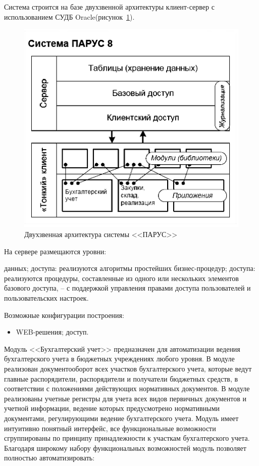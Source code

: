 \documentclass[14pt,a4paper]{reportmod}
\begin{document}
Система строится на базе двухзвенной архитектуры клиент-сервер с использованием СУДБ Oracle(рисунок~\ref{pic:parus_pic1}).
\begin{figure}
  \centering
  \includegraphics[scale=0.7]{pics/parus_img1_wb}
  \caption{Двухзвенная архитектура системы <<ПАРУС>>}
  \label{pic:parus_pic1}
\end{figure}
На сервере размещаются уровни:
\begin{itemize}
 данных;
 доступа: реализуются алгоритмы простейших бизнес-процедур;
 доступа: реализуются процедуры, составленные из одного или нескольких элементов базового доступа, – с поддержкой управления правами доступа пользователей и пользовательских настроек.
\end{itemize}
Возможные конфигурации построения:
\begin{itemize}
  ;
   сеть;
  \item WEB-решения;
   доступ.
\end{itemize}
Модуль <<Бухгалтерский учет>> предназначен для автоматизации ведения бухгалтерского учета в бюджетных учреждениях любого уровня. В модуле реализован документооборот всех участков бухгалтерского учета, которые ведут главные распорядители, распорядители и получатели бюджетных средств, в соответствии с положениями действующих нормативных документов.
В модуле реализованы учетные регистры для учета всех видов первичных документов и учетной информации, ведение которых предусмотрено нормативными документами, регулирующими ведение бухгалтерского учета. Модуль имеет интуитивно понятный интерфейс, все функциональные возможности сгруппированы по принципу принадлежности к участкам бухгалтерского учета. Благодаря широкому набору функциональных возможностей модуль позволяет полностью автоматизировать:
\begin{gostenumerate}
\end{gostenumerate}
\end{document}
